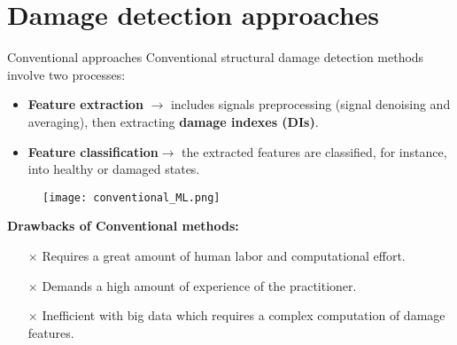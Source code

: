 \documentclass[10pt,aspectratio=169,dvipsnames]{beamer} %
\begin{document}
	\section{Damage detection approaches}
	\begin{frame}{Conventional approaches}
		Conventional structural damage detection methods involve two processes:
		\begin{itemize}
			\item \alert{\textbf{Feature extraction}} \(\rightarrow\) includes signals preprocessing (signal denoising and averaging), then extracting \textbf{damage indexes (DIs)}.
			\item \alert{\textbf{Feature classification}}\(\rightarrow\) the extracted features are classified, for instance, into healthy or damaged states.
		\end{itemize}
		\begin{figure}
			\centering
			\texttt{[image: conventional\_ML.png]}
		\end{figure}	
		\textbf{Drawbacks of Conventional methods:}
		\begin{itemize}
			\item[$\times$]\alert{Requires a great amount of human labor and computational effort.}
			\item[$\times$]\alert{Demands a high amount of experience of the practitioner.}
			\item[$\times$]\alert{Inefficient with big data which requires a complex computation of damage features.} 
		\end{itemize}
	\end{frame}
	
\end{document}
